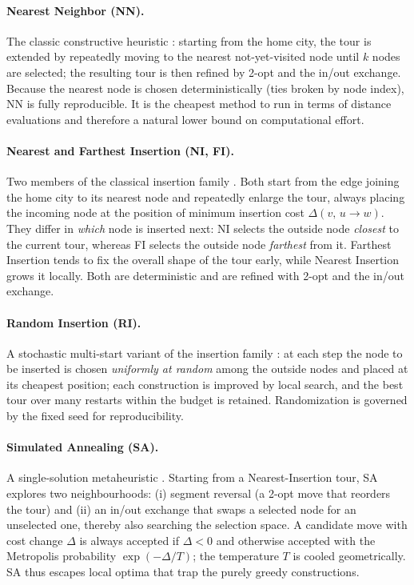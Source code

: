 \documentclass[conference]{IEEEtran}
\begin{document}
\paragraph{Nearest Neighbor (NN).}
The classic constructive heuristic \cite{rosenkrantz1977}: starting from the home city, the tour is extended by repeatedly moving to the nearest not-yet-visited node until $k$ nodes are selected; the resulting tour is then refined by 2-opt and the in/out exchange. Because the nearest node is chosen deterministically (ties broken by node index), NN is fully reproducible. It is the cheapest method to run in terms of distance evaluations and therefore a natural lower bound on computational effort.

\paragraph{Nearest and Farthest Insertion (NI, FI).}
Two members of the classical insertion family \cite{rosenkrantz1977}. Both start from the edge joining the home city to its nearest node and repeatedly enlarge the tour, always placing the incoming node at the position of minimum insertion cost $\Delta(v,\,u\!\to\!w)$. They differ in \emph{which} node is inserted next: NI selects the outside node \emph{closest} to the current tour, whereas FI selects the outside node \emph{farthest} from it. Farthest Insertion tends to fix the overall shape of the tour early, while Nearest Insertion grows it locally. Both are deterministic and are refined with 2-opt and the in/out exchange.

\paragraph{Random Insertion (RI).}
A stochastic multi-start variant of the insertion family \cite{rosenkrantz1977}: at each step the node to be inserted is chosen \emph{uniformly at random} among the outside nodes and placed at its cheapest position; each construction is improved by local search, and the best tour over many restarts within the budget is retained. Randomization is governed by the fixed seed for reproducibility.

\paragraph{Simulated Annealing (SA).}
A single-solution metaheuristic \cite{kirkpatrick1983}. Starting from a Nearest-Insertion tour, SA explores two neighbourhoods: (i) segment reversal (a 2-opt move that reorders the tour) and (ii) an in/out exchange that swaps a selected node for an unselected one, thereby also searching the selection space. A candidate move with cost change $\Delta$ is always accepted if $\Delta<0$ and otherwise accepted with the Metropolis probability $\exp(-\Delta/T)$; the temperature $T$ is cooled geometrically. SA thus escapes local optima that trap the purely greedy constructions.
\end{document}
